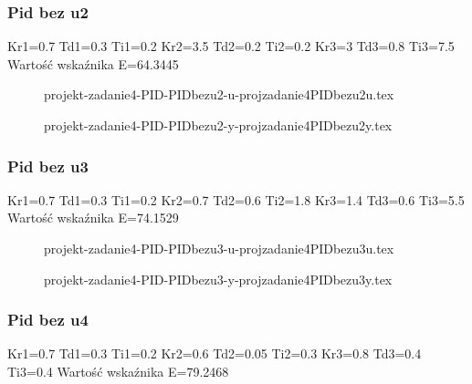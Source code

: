 \subsubsection{Pid bez u2}

Kr1=0.7 Td1=0.3 Ti1=0.2 Kr2=3.5 Td2=0.2 Ti2=0.2 Kr3=3 Td3=0.8 Ti3=7.5
Wartość wskaźnika E=64.3445

\ifdefined\CompileFigures
    \begin{figure}[H] 
        \centering
        
        \caption{projekt-zadanie4-PID-PIDbezu2-u-projzadanie4PIDbezu2u.tex}
        \label{projekt:zad4:figure:projzadanie4PIDbezu2u}
    \end{figure}
\fi

\ifdefined\CompileFigures
    \begin{figure}[H] 
        \centering
        
        \caption{projekt-zadanie4-PID-PIDbezu2-y-projzadanie4PIDbezu2y.tex}
        \label{projekt:zad4:figure:projzadanie4PIDbezu2y}
    \end{figure}
\fi


\subsubsection{Pid bez u3}
Kr1=0.7 Td1=0.3 Ti1=0.2 Kr2=0.7 Td2=0.6 Ti2=1.8 Kr3=1.4 Td3=0.6 Ti3=5.5
Wartość wskaźnika E=74.1529

\ifdefined\CompileFigures
    \begin{figure}[H] 
        \centering
        
        \caption{projekt-zadanie4-PID-PIDbezu3-u-projzadanie4PIDbezu3u.tex}
        \label{projekt:zad4:figure:projzadanie4PIDbezu3u}
    \end{figure}
\fi

\ifdefined\CompileFigures
    \begin{figure}[H] 
        \centering
        
        \caption{projekt-zadanie4-PID-PIDbezu3-y-projzadanie4PIDbezu3y.tex}
        \label{projekt:zad4:figure:projzadanie4PIDbezu3y}
    \end{figure}
\fi


\subsubsection{Pid bez u4}
Kr1=0.7 Td1=0.3 Ti1=0.2 Kr2=0.6 Td2=0.05 Ti2=0.3 Kr3=0.8 Td3=0.4 Ti3=0.4
Wartość wskaźnika E=79.2468

